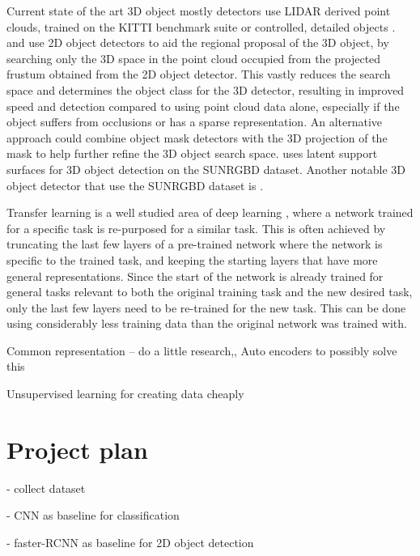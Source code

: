 \documentclass[11pt]{article}
\begin{document}
{Current state of the art 3D object mostly detectors use LIDAR derived point clouds, trained on the KITTI benchmark suite \cite{point_fusion}\cite{multi_fusion}\cite{fast_furious}\cite{VoxelNet} or controlled, detailed objects \cite{subgroup_voting}\cite{pose_RGBD}\cite{real_time_single}. \cite{PointNets} and \cite{frustum} use 2D object detectors to aid the regional proposal of the 3D object, by searching only the 3D space in the point cloud occupied from the projected frustum obtained from the 2D object detector. This vastly reduces the search space and determines the object class for the 3D detector, resulting in improved speed and detection compared to using point cloud data alone, especially if the object suffers from occlusions or has a sparse representation. An alternative approach could combine object mask detectors\cite{first_person_mask}\cite{MASK-RCNN} with the 3D projection of the mask to help further refine the 3D object search space. \cite{latent_surface} uses latent support surfaces for 3D object detection on the SUNRGBD dataset. Another notable 3D object detector that use the SUNRGBD dataset is \cite{SnapNet}. 

Transfer learning is a well studied area of deep learning \cite{DeCAF}\cite{survery_on_transfer}\cite{how_transferable}, where a network trained for a specific task is re-purposed for a similar task. This is often achieved by truncating the last few layers of a pre-trained network where the network is specific to the trained task, and keeping the starting layers that have more general representations. Since the start of the network is already trained for general tasks relevant to both the original training task and the new desired task, only the last few layers need to be re-trained for the new task. This can be done using considerably less training data than the original network was trained with.

Common representation -- do a little research,,
	Auto encoders to possibly solve this 

Unsupervised learning for creating data cheaply


\section{Project plan}

- collect dataset

- CNN as baseline for classification

- faster-RCNN as baseline for 2D object detection

}
\end{document}
